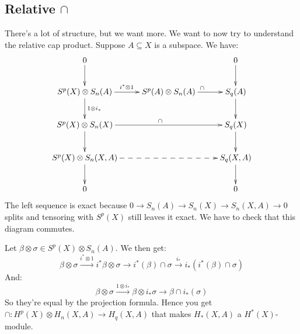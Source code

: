 \documentclass{amsart}
\theoremstyle{theorem}
\theoremstyle{definition}
\begin{document}
\subsection{Relative $\cap$}
There's a lot of structure, but we want more. We want to now try to understand the relative cap product. Suppose $A\subseteq X$ is a subspace. We have:
\begin{equation*}
\xymatrix{
	0\ar[d] & & 0\ar[d]\\
	S^p(X)\otimes S_n(A)\ar[d]^{1\otimes i_\ast}\ar[r]^{i^\ast\otimes 1} & S^p(A)\otimes S_n(A)\ar[r]^{\cap} & S_q(A)\ar[d]\\
	S^p(X)\otimes S_n(X)\ar[rr]^\cap\ar[d] & & S_q(X)\ar[d]\\
	S^p(X)\otimes S_n(X,A)\ar[d]\ar@{-->}[rr] & & S_q(X,A)\ar[d]\\
	0 & & 0
}
\end{equation*}
The left sequence is exact because $0\to S_n(A)\to S_n(X)\to S_n(X,A)\to 0$ splits and tensoring with $S^p(X)$ still leaves it exact. We have to check that this diagram commutes.

Let $\beta\otimes \sigma\in S^p(X)\otimes S_n(A)$. We then get:
\begin{equation*}
\beta\otimes\sigma\xrightarrow{i^\ast\otimes 1}i^\ast\beta\otimes\sigma\to i^\ast(\beta)\cap\sigma\xrightarrow{i_\ast}i_\ast(i^\ast(\beta)\cap\sigma)
\end{equation*}
And:
\begin{equation*}
\beta\otimes\sigma\xrightarrow{1\otimes i_\ast}\beta\otimes i_\ast\sigma\to \beta\cap i_\ast(\sigma)
\end{equation*}
So they're equal by the projection formula. Hence you get $\cap: H^p(X)\otimes H_n(X,A)\to H_q(X,A)$ that makes $ H_\ast(X,A)$ a $ H^\ast(X)$-module.
\end{document}
